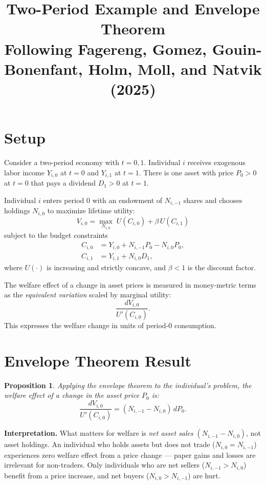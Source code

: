 \documentclass[12pt]{article}
\title{Two-Period Example and Envelope Theorem \\ \medskip \large Following Fagereng, Gomez, Gouin-Bonenfant, Holm, Moll, and Natvik (2025)}
\author{}
\date{}
\newtheorem{proposition}{Proposition}
\begin{document}
\maketitle

\section{Setup}

Consider a two-period economy with $t = 0, 1$. Individual $i$ receives exogenous labor income $Y_{i,0}$ at $t=0$ and $Y_{i,1}$ at $t=1$. There is one asset with price $P_0 > 0$ at $t=0$ that pays a dividend $D_1 > 0$ at $t=1$.

Individual $i$ enters period $0$ with an endowment of $N_{i,-1}$ shares and chooses holdings $N_{i,0}$ to maximize lifetime utility:
\begin{equation}
  V_{i,0} = \max_{N_{i,0}} \; U(C_{i,0}) + \beta \, U(C_{i,1})
\end{equation}
subject to the budget constraints
\begin{align}
  C_{i,0} &= Y_{i,0} + N_{i,-1} P_0 - N_{i,0} P_0, \label{eq:bc0} \\
  C_{i,1} &= Y_{i,1} + N_{i,0} D_1, \label{eq:bc1}
\end{align}
where $U(\cdot)$ is increasing and strictly concave, and $\beta < 1$ is the discount factor.

The welfare effect of a change in asset prices is measured in money-metric terms as the \emph{equivalent variation} scaled by marginal utility:
\begin{equation}
  \frac{dV_{i,0}}{U'(C_{i,0})}.
\end{equation}
This expresses the welfare change in units of period-0 consumption.

\section{Envelope Theorem Result}

\begin{proposition}
  Applying the envelope theorem to the individual's problem, the welfare effect of a change in the asset price $P_0$ is:
  \begin{equation} \label{eq:envelope}
    \frac{dV_{i,0}}{U'(C_{i,0})} = (N_{i,-1} - N_{i,0}) \, dP_0.
  \end{equation}
\end{proposition}

\noindent \textbf{Interpretation.} What matters for welfare is \emph{net asset sales} $(N_{i,-1} - N_{i,0})$, not asset holdings. An individual who holds assets but does not trade ($N_{i,0} = N_{i,-1}$) experiences zero welfare effect from a price change --- paper gains and losses are irrelevant for non-traders. Only individuals who are net sellers ($N_{i,-1} > N_{i,0}$) benefit from a price increase, and net buyers ($N_{i,0} > N_{i,-1}$) are hurt.
\end{document}
